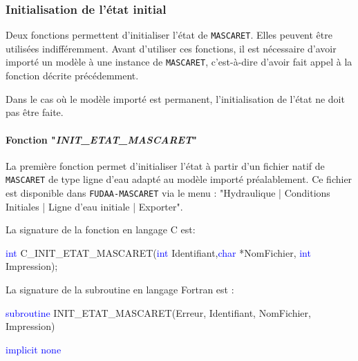 \documentclass[a4paper,11pt]{article}
\begin{document}
\subsubsection{Initialisation de l'\'etat initial}

 \label{Init}

 Deux fonctions permettent d'initialiser l'\'etat de \texttt{MASCARET}. Elles peuvent \^etre utilis\'ees indiff\'eremment. Avant d'utiliser ces fonctions, il est n\'ecessaire d'avoir import\'e un mod\`ele \`a une instance de \texttt{MASCARET}, c'est-\`a-dire d'avoir fait appel \`a la fonction d\'ecrite pr\'ec\'edemment.
 
 \vspace{0.5cm}

 Dans le cas o\`u le mod\`ele import\'e est permanent, l'initialisation de l'\'etat ne doit pas \^etre faite.

 \paragraph{Fonction "\textit{INIT\_ETAT\_MASCARET}"\\}

 \hspace*{1cm}

 La premi\`ere fonction permet d'initialiser l'\'etat \`a partir d'un fichier natif de \texttt{MASCARET} de type ligne d'eau adapt\'e au mod\`ele import\'e pr\'ealablement. Ce fichier est disponible dans \texttt{FUDAA-MASCARET} via le menu : "Hydraulique | Conditions Initiales | Ligne d'eau initiale | Exporter".
 
 \vspace{0.5cm}
 
 La signature de la fonction en langage C est:
 
 \vspace{0.5cm}
 
 \textcolor{blue}{int} C\_INIT\_ETAT\_MASCARET(\textcolor{blue}{int} Identifiant,\textcolor{blue}{char} *NomFichier, \textcolor{blue}{int} Impression);
 
 \vspace{0.5cm} 
 
 La signature de la subroutine en langage Fortran est :
 
 \vspace{0.5cm}
 
    \textcolor{blue}{subroutine} INIT\_ETAT\_MASCARET(Erreur, Identifiant, NomFichier, Impression)
    
        \hspace{1cm}\textcolor{blue}{implicit none}                 
        
\end{document}
